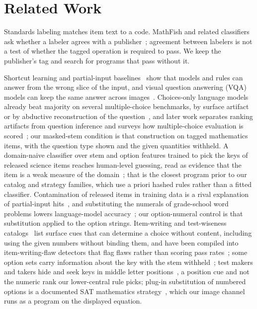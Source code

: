 \section{Related Work}
\label{sec:related}

Standards labeling matches item text to a code. MathFish and related classifiers ask whether a labeler agrees with a publisher~\cite{lucy2024mathfish}; agreement between labelers is not a test of whether the tagged operation is required to pass. We keep the publisher's tag and search for programs that pass without it.

Shortcut learning and partial-input baselines~\cite{Geirhos_2020,gururangan-etal-2018-annotation,poliak-etal-2018-hypothesis,mccoy-etal-2019-right,kaushik-lipton-2018-much} show that models and rules can answer from the wrong slice of the input, and visual question answering (VQA) models can keep the same answer across images~\cite{agrawal-etal-2016-analyzing}. Choices-only language models already beat majority on several multiple-choice benchmarks, by surface artifact or by abductive reconstruction of the question~\cite{balepur-etal-2024-artifacts}, and later work separates ranking artifacts from question inference and surveys how multiple-choice evaluation is scored~\cite{balepur-rudinger-2024-large,balepur-etal-2025-best}; our masked-stem condition is that construction on tagged mathematics items, with the question type shown and the given quantities withheld. A domain-naive classifier over stem and option features trained to pick the keys of released science items reaches human-level guessing, read as evidence that the item is a weak measure of the domain~\cite{Watson_2018}; that is the closest program prior to our catalog and strategy families, which use a priori hashed rules rather than a fitted classifier. Contamination of released items in training data is a rival explanation of partial-input hits~\cite{magar-schwartz-2022-data,sainz-etal-2023-nlp}, and substituting the numerals of grade-school word problems lowers language-model accuracy~\cite{mirzadeh2025gsmsymbolic}; our option-numeral control is that substitution applied to the option strings. Item-writing and test-wiseness catalogs~\cite{Millman_1965,Haladyna_2002,Haladyna_Rodriguez_2013} list surface cues that can determine a choice without content, including using the given numbers without binding them, and have been compiled into item-writing-flaw detectors that flag flaws rather than scoring pass rates~\cite{Moore_2024}; some option sets carry information about the key with the stem withheld~\cite{White_Zammarelli_1981}; test makers and takers hide and seek keys in middle letter positions~\cite{Attali_2003}, a position cue and not the numeric rank our lower-central rule picks; plug-in substitution of numbered options is a documented SAT mathematics strategy~\cite{Katz_Bennett_Berger_2000}, which our image channel runs as a program on the displayed equation.

